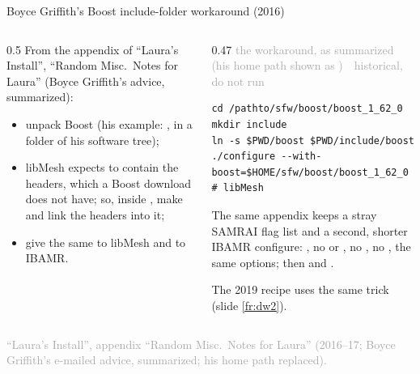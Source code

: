 \documentclass[aspectratio=169,11pt]{beamer}
\newcommand{\sourcecredit}[1]{\vfill\begin{flushright}\tiny\textcolor{DarkGray}{#1}\end{flushright}}
\newcommand{\hist}[1]{{\tiny\sffamily\textcolor{DarkGray}{#1\ \textbullet\ historical, do not run}}\par\nointerlineskip\vspace{0.3mm}}
\begin{document}
\begin{frame}[fragile]{Boyce Griffith's Boost include-folder workaround (2016)}
\label{fr:boostws}
\begin{columns}[T,onlytextwidth]
\begin{column}{0.5\textwidth}
\small From the appendix of ``Laura's Install'', ``Random Misc.\ Notes for Laura'' (Boyce Griffith's advice, summarized):
\begin{itemize}\setlength{\itemsep}{3pt}
  \item unpack Boost (his example: , in a  folder of his software tree);
  \item libMesh expects  to contain the headers, which a Boost download does not have; so, inside , make  and link the headers into it;
  \item give the same  to libMesh and to IBAMR.
\end{itemize}
\end{column}
\begin{column}{0.47\textwidth}
\hist{the workaround, as summarized (his home path shown as \code{/pathto})}
\begin{lstlisting}[style=hist]
cd /pathto/sfw/boost/boost_1_62_0
mkdir include
ln -s $PWD/boost $PWD/include/boost
./configure --with-boost=$HOME/sfw/boost/boost_1_62_0   # libMesh
\end{lstlisting}
\footnotesize The same appendix keeps a stray SAMRAI flag list and a second, shorter IBAMR configure: , no  or , no , no , the same  options; then  and .

\vspace{1mm}
The 2019 recipe uses the same trick (slide \ref{fr:dw2}).
\end{column}
\end{columns}
\sourcecredit{``Laura's Install'', appendix ``Random Misc.\ Notes for Laura'' (2016--17; Boyce Griffith's e-mailed advice, summarized; his home path replaced).}
\end{frame}
\end{document}
